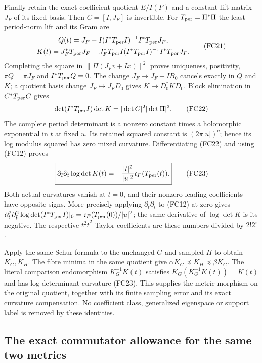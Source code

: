 Finally retain the exact coefficient quotient $E/I(F)$ and a constant
lift matrix $J_F$ of its fixed basis. Then $C=[I,J_F]$ is invertible.
For $T_{\rm per}=\Pi^*\Pi$ the least-period-norm lift and its Gram are
\[
\begin{gathered}
 Q(t)=J_F-I(I^*T_{\rm per}I)^{-1}I^*T_{\rm per}J_F,\\
 K(t)=J_F^*T_{\rm per}J_F
   -J_F^*T_{\rm per}I(I^*T_{\rm per}I)^{-1}I^*T_{\rm per}J_F.
\end{gathered}\tag{FC21}
\]
Completing the square in $\|\Pi(J_Fv+Ix)\|^2$ proves uniqueness,
positivity, $\pi Q=\pi J_F$ and $I^*T_{\rm per}Q=0$.
The change $J_F\mapsto J_F+IB_0$ cancels exactly in $Q$ and $K$;
a quotient basis change $J_F\mapsto J_FD_0$ gives $K\mapsto D_0^*KD_0$.
Block elimination in $C^*T_{\rm per}C$ gives
\[
 \det(I^*T_{\rm per}I)\det K
       =|\det C|^2|\det\Pi|^2.
 \tag{FC22}
\]
The complete period determinant is a nonzero constant times a
holomorphic exponential in $t$ at fixed $u$. Its retained squared
constant is $(2\pi|u|)^q$; hence its log modulus squared has zero mixed
curvature. Differentiating (FC22) and using (FC12) proves
\[
 \boxed{\partial_{\bar t}\partial_t\log\det K(t)
       =-\frac{|t|^2}{|u|^2}\mathfrak c_F(T_{\rm per}(t)).}
 \tag{FC23}
\]
Both actual curvatures vanish at $t=0$, and their nonzero leading
coefficients have opposite signs. More precisely applying
$\partial_t\partial_{\bar t}$ to (FC12) at zero gives
$\partial_t^2\partial_{\bar t}^2\log\det(I^*T_{\rm per}I)|_0
=\mathfrak c_F(T_{\rm per}(0))/|u|^2$; the same derivative of
$\log\det K$ is its negative. The respective $t^2\bar t^2$ Taylor
coefficients are these numbers divided by $2!2!$.

Apply the same Schur formula to the unchanged $G$ and sampled $H$ to
obtain $K_G,K_H$. The fibre minima in the same quotient give
$\alpha K_G\preceq K_H\preceq\beta K_G$.
The literal comparison endomorphism $K_G^{-1}K(t)$ satisfies
$K_G(K_G^{-1}K(t))=K(t)$ and has log determinant curvature (FC23).
This supplies the metric morphism on the original quotient, together
with its finite sampling error and its exact curvature compensation.
No coefficient class, generalized eigenspace or support label is
removed by these identities.

\subsection{The exact commutator allowance for the same two metrics}

